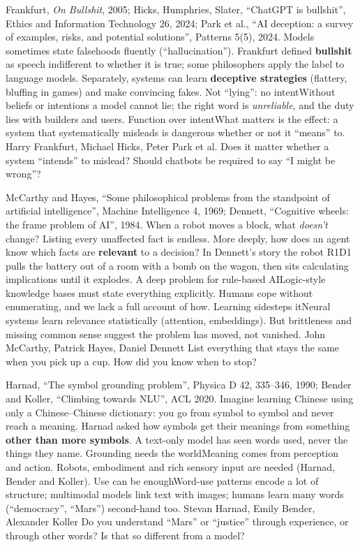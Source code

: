 {Frankfurt, \emph{On Bullshit}, 2005; Hicks, Humphries, Slater, ``ChatGPT is bullshit'', Ethics and Information Technology 26, 2024; Park et al., ``AI deception: a survey of examples, risks, and potential solutions'', Patterns 5(5), 2024.}
{Models sometimes state falsehoods fluently (``hallucination''). Frankfurt defined \textbf{bullshit} as speech indifferent to whether it is true; some philosophers apply the label to language models. Separately, systems can learn \textbf{deceptive strategies} (flattery, bluffing in games) and make convincing fakes.}
{Not ``lying'': no intent}{Without beliefs or intentions a model cannot lie; the right word is \emph{unreliable}, and the duty lies with builders and users.}
{Function over intent}{What matters is the effect: a system that systematically misleads is dangerous whether or not it ``means'' to.}
{Harry Frankfurt, Michael Hicks, Peter Park et al.}
{Does it matter whether a system ``intends'' to mislead? Should chatbots be required to say ``I might be wrong''?}

{McCarthy and Hayes, ``Some philosophical problems from the standpoint of artificial intelligence'', Machine Intelligence 4, 1969; Dennett, ``Cognitive wheels: the frame problem of AI'', 1984.}
{When a robot moves a block, what \emph{doesn't} change? Listing every unaffected fact is endless. More deeply, how does an agent know which facts are \textbf{relevant} to a decision? In Dennett's story the robot R1D1 pulls the battery out of a room with a bomb on the wagon, then sits calculating implications until it explodes.}
{A deep problem for rule-based AI}{Logic-style knowledge bases must state everything explicitly. Humans cope without enumerating, and we lack a full account of how.}
{Learning sidesteps it}{Neural systems learn relevance statistically (attention, embeddings). But brittleness and missing common sense suggest the problem has moved, not vanished.}
{John McCarthy, Patrick Hayes, Daniel Dennett}
{List everything that stays the same when you pick up a cup. How did you know when to stop?}

{Harnad, ``The symbol grounding problem'', Physica D 42, 335--346, 1990; Bender and Koller, ``Climbing towards NLU'', ACL 2020.}
{Imagine learning Chinese using only a Chinese--Chinese dictionary: you go from symbol to symbol and never reach a meaning. Harnad asked how symbols get their meanings from something \textbf{other than more symbols}. A text-only model has seen words used, never the things they name.}
{Grounding needs the world}{Meaning comes from perception and action. Robots, embodiment and rich sensory input are needed (Harnad, Bender and Koller).}
{Use can be enough}{Word-use patterns encode a lot of structure; multimodal models link text with images; humans learn many words (``democracy'', ``Mars'') second-hand too.}
{Stevan Harnad, Emily Bender, Alexander Koller}
{Do you understand ``Mars'' or ``justice'' through experience, or through other words? Is that so different from a model?}

